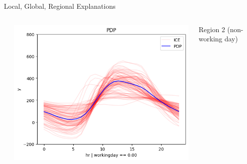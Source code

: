 \documentclass[10pt,compress,t,notes=noshow, xcolor=table]{beamer}
\begin{document}
\begin{frame}{Local, Global, Regional Explanations}
{\begin{columns}[c, totalwidth=\textwidth]
\begin{column}{0.01\textwidth}
    \end{column}
    \begin{column}{0.37\textwidth}
\includegraphics[trim=0 0 0 20, clip, width=\textwidth]{figure/01_bike_sharing_dataset_28_0.png}
    \end{column}
    \begin{column}{0.125\textwidth}
    \centering
        \scriptsize Region 2 (non-working day)
    \end{column}
\end{columns}}
\end{frame}
\end{document}

